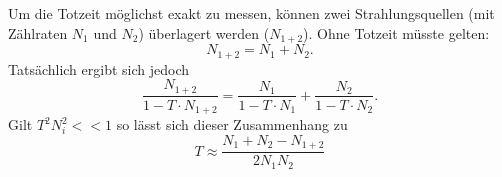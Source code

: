 Um die Totzeit möglichst exakt zu messen, können zwei Strahlungsquellen (mit Zählraten $N_1$ und $N_2$) überlagert werden ($N_{1+2}$). Ohne Totzeit müsste gelten:
\begin{equation*}
  N_{1+2} = N_1 + N_2.
\end{equation*}
Tatsächlich ergibt sich jedoch
\begin{equation}
  \frac{N_{1+2}}{1- T\cdot N_{1+2}} = \frac{N_1}{1-T\cdot N_1} + \frac{N_2}{1-T\cdot N_2}.
  \label{eqn:2Quellen}
\end{equation}
Gilt $T^2N_i^2<<1$ so lässt sich dieser Zusammenhang zu
\begin{equation}
  T \approx \frac{N_1+N_2-N_{1+2}}{2N_1 N_2}
  \label{eqn:easy}
\end{equation}
